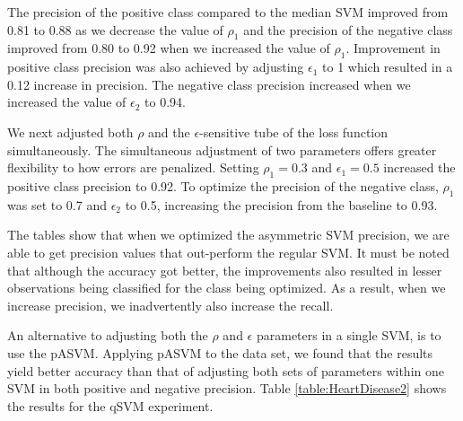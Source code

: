 \documentclass[twoside,11pt]{article}
\begin{document}
The precision of the positive class compared to the median SVM improved from 0.81 to 0.88 as we decrease the value of $\rho_1$ and the precision of the negative class improved from 0.80 to 0.92 when we increased the value of $\rho_1$. Improvement in positive class precision was also achieved by adjusting $\epsilon_1$ to 1 which resulted in a 0.12 increase in precision. The negative class precision increased when we increased the value of $\epsilon_2$ to 0.94. 


We next adjusted both $\rho$ and the $\epsilon$-sensitive tube of the loss function simultaneously. The simultaneous adjustment of two parameters offers greater flexibility to how errors are penalized. Setting $\rho_1=0.3$ and $\epsilon_1=0.5$ increased the positive class precision to 0.92. To optimize the precision of the negative class, $\rho_1$ was set to 0.7 and $\epsilon_2$ to 0.5, increasing the precision from the baseline to 0.93. 

The tables show that when we optimized the asymmetric SVM precision, we are able to get precision values that out-perform the regular SVM. It must be noted that although the accuracy got better, the improvements also resulted in lesser observations being classified for the class being optimized. As a result, when we increase precision, we inadvertently also increase the recall. 

An alternative to adjusting both the $\rho$ and $\epsilon$ parameters in a single SVM, is to use the pASVM. Applying pASVM to the data set, we found that the results yield better accuracy than that of adjusting both sets of parameters within one SVM in both positive and negative precision. Table \ref{table:HeartDisease2} shows the results for the qSVM experiment. 
\end{document}
